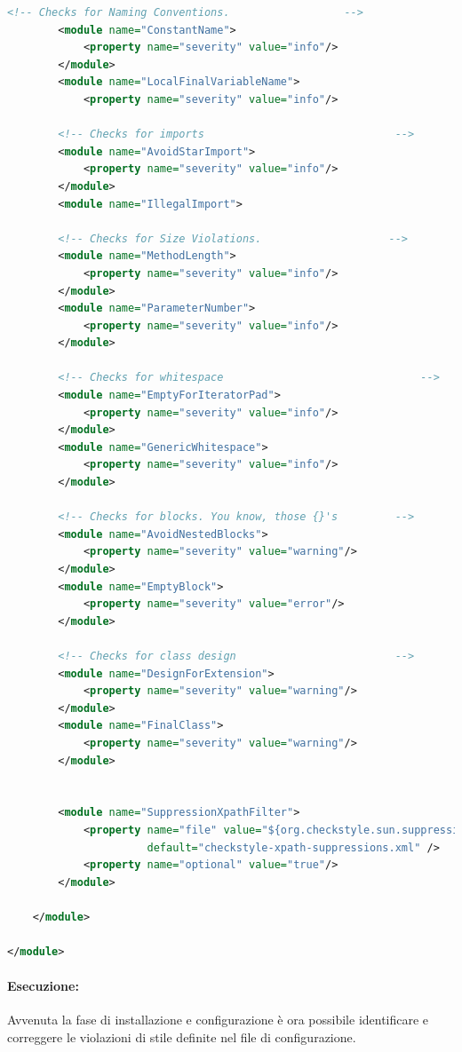 \begin{lstlisting}[language=XML, caption={Personalizzazioni regole di Sun Checkstyle}]
        <!-- Checks for Naming Conventions.                  -->
        <module name="ConstantName">
            <property name="severity" value="info"/>
        </module>
        <module name="LocalFinalVariableName">
            <property name="severity" value="info"/>
        
        <!-- Checks for imports                              -->
        <module name="AvoidStarImport">
            <property name="severity" value="info"/>
        </module>
        <module name="IllegalImport"> 

        <!-- Checks for Size Violations.                    -->
        <module name="MethodLength">
            <property name="severity" value="info"/>
        </module>
        <module name="ParameterNumber">
            <property name="severity" value="info"/>
        </module>

        <!-- Checks for whitespace                               -->
        <module name="EmptyForIteratorPad">
            <property name="severity" value="info"/>
        </module>
        <module name="GenericWhitespace">
            <property name="severity" value="info"/>
        </module>

        <!-- Checks for blocks. You know, those {}'s         -->
        <module name="AvoidNestedBlocks">
            <property name="severity" value="warning"/>
        </module>
        <module name="EmptyBlock">
            <property name="severity" value="error"/>
        </module>

        <!-- Checks for class design                         -->
        <module name="DesignForExtension">
            <property name="severity" value="warning"/>
        </module>
        <module name="FinalClass">
            <property name="severity" value="warning"/>
        </module>


        <module name="SuppressionXpathFilter">
            <property name="file" value="${org.checkstyle.sun.suppressionxpathfilter.config}"
                      default="checkstyle-xpath-suppressions.xml" />
            <property name="optional" value="true"/>
        </module>

    </module>

</module>
\end{lstlisting}

\paragraph{Esecuzione:}
Avvenuta la fase di installazione e configurazione è ora possibile identificare e correggere le violazioni di stile definite nel file di configurazione.

